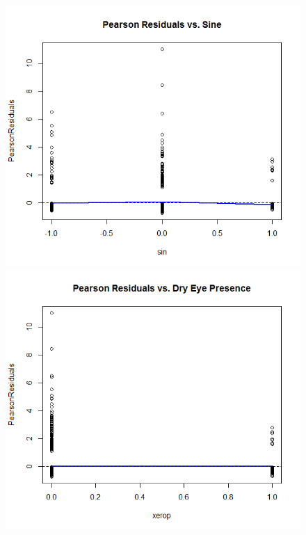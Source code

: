 \documentclass[11pt]{article}
\begin{document}
\begin{enumerate}
\begin{figure}[H]
		\includegraphics[scale=0.4]{Rplot4-mean5}
		\includegraphics[scale=0.4]{Rplot4-mean6}

\end{figure}
\end{enumerate}
\end{document}

